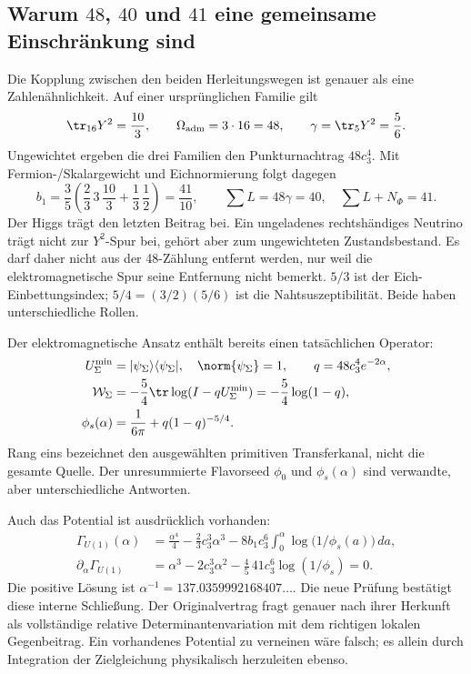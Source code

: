 \subsection{Warum $48$, $40$ und $41$ eine gemeinsame Einschränkung sind}
Die Kopplung zwischen den beiden Herleitungswegen ist genauer als eine Zahlenähnlichkeit. Auf einer ursprünglichen Familie gilt
\begin{equation}
\tr_{16}Y^2=\frac{10}3,\qquad
\Omega_{\rm adm}=3\cdot16=48,\qquad
\gamma=\tr_{5}Y^2=\frac56.
\end{equation}
Ungewichtet ergeben die drei Familien den Punkturnachtrag $48c_3^4$. Mit Fermion-/Skalargewicht und Eichnormierung folgt dagegen
\begin{equation}
b_1=\frac35\left(\frac23\,3\,\frac{10}3+\frac13\,\frac12\right)
=\frac{41}{10},\qquad
\sum L=48\gamma=40,\quad \sum L+N_\Phi=41.
\end{equation}
Der Higgs trägt den letzten Beitrag bei. Ein ungeladenes rechtshändiges Neutrino trägt nicht zur $Y^2$-Spur bei, gehört aber zum ungewichteten Zustandsbestand. Es darf daher nicht aus der 48-Zählung entfernt werden, nur weil die elektromagnetische Spur seine Entfernung nicht bemerkt. $5/3$ ist der Eich-Einbettungsindex; $5/4=(3/2)(5/6)$ ist die Nahtsuszeptibilität. Beide haben unterschiedliche Rollen.

Der elektromagnetische Ansatz enthält bereits einen tatsächlichen Operator:
\begin{align}
U_\Sigma^{\min}&=|\psi_\Sigma\rangle\langle\psi_\Sigma|,
\quad \norm{\psi_\Sigma}=1,\qquad q=48c_3^4e^{-2\alpha},\\
\mathcal W_\Sigma&=-\frac54\tr\log(I-qU_\Sigma^{\min})
=-\frac54\log(1-q),\\
\phi_s(\alpha)&=\frac1{6\pi}+q(1-q)^{-5/4}.
\end{align}
Rang eins bezeichnet den ausgewählten primitiven Transferkanal, nicht die gesamte Quelle. Der unresummierte Flavorseed $\phi_0$ und $\phi_s(\alpha)$ sind verwandte, aber unterschiedliche Antworten.

Auch das Potential ist ausdrücklich vorhanden:
\begin{align}
\Gamma_{U(1)}(\alpha)&=\frac{\alpha^4}{4}-\frac23c_3^3\alpha^3
-8b_1c_3^6\int_0^\alpha\log\bigl(1/\phi_s(a)\bigr)\,da,\\
\partial_\alpha\Gamma_{U(1)}&=
\alpha^3-2c_3^3\alpha^2-\frac45\,41c_3^6\log(1/\phi_s)=0.
\end{align}
Die positive Lösung ist $\alpha^{-1}=137.0359992168407\ldots$. Die neue Prüfung bestätigt diese interne Schließung. Der Originalvertrag  fragt genauer nach ihrer Herkunft als vollständige relative Determinantenvariation mit dem richtigen lokalen Gegenbeitrag. Ein vorhandenes Potential zu verneinen wäre falsch; es allein durch Integration der Zielgleichung physikalisch herzuleiten ebenso.

